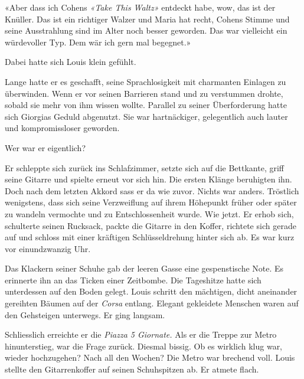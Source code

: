 «Aber dass ich Cohens \emph{«Take This Waltz»} entdeckt habe, wow, das ist der Knüller. Das ist ein richtiger Walzer und Maria hat recht, Cohens Stimme und seine Ausstrahlung sind im Alter noch besser geworden. Das war vielleicht ein würdevoller Typ. Dem wär ich gern mal begegnet.»

Dabei hatte sich Louis klein gefühlt.


Lange hatte er es geschafft, seine Sprachlosigkeit mit charmanten Einlagen zu überwinden. Wenn er vor seinen Barrieren stand und zu verstummen drohte, sobald sie mehr von ihm wissen wollte. Parallel zu seiner Überforderung hatte sich Giorgias Geduld abgenutzt. Sie war hartnäckiger, gelegentlich auch lauter und kompromissloser geworden.

\sectionbreak 

Wer war er eigentlich?

Er schleppte sich zurück ins Schlafzimmer, setzte sich auf die Bettkante, griff seine Gitarre und spielte erneut vor sich hin. Die ersten Klänge beruhigten ihn. Doch nach dem letzten Akkord sass er da wie zuvor. Nichts war anders. Tröstlich wenigstens, dass sich seine Verzweiflung auf ihrem Höhepunkt früher oder später zu wandeln vermochte und zu Entschlossenheit wurde. Wie jetzt. Er erhob sich, schulterte seinen Rucksack, packte die Gitarre in den Koffer, richtete sich gerade auf und schloss mit einer kräftigen Schlüsseldrehung hinter sich ab. Es war kurz vor einundzwanzig Uhr. 

Das Klackern seiner Schuhe gab der leeren Gasse eine gespenstische Note. Es erinnerte ihn an das Ticken einer Zeitbombe.
Die Tageshitze hatte sich unterdessen auf den Boden gelegt. Louis schritt den mächtigen, dicht aneinander gereihten Bäumen auf der \emph{Corsa} entlang. Elegant gekleidete Menschen waren auf den Gehsteigen unterwegs. Er ging langsam.
 
Schliesslich erreichte er die \emph{Piazza 5 Giornate.} 
Als er die Treppe zur Metro hinunterstieg, war die Frage zurück. Diesmal bissig. Ob es wirklich klug war, wieder hochzugehen? Nach all den Wochen?
Die Metro war brechend voll. 
Louis stellte den Gitarrenkoffer auf seinen Schuhspitzen ab. Er atmete flach.
